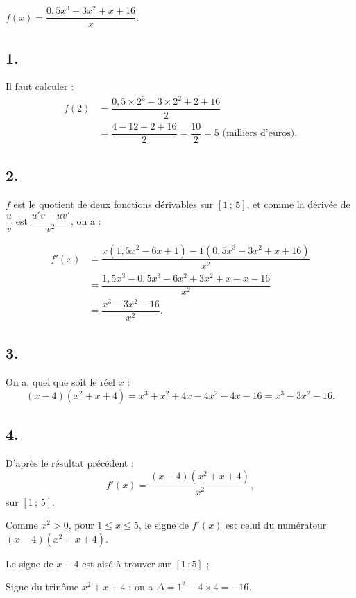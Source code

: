 \( f(x) = \dfrac{0{,}5x^3 - 3x^2 + x + 16}{x} \).

\subsection*{1.}

Il faut calculer :
\begin{align*}
f(2) &= \dfrac{0{,}5 \times 2^3 - 3 \times 2^2 + 2 + 16}{2} \\
&= \dfrac{4 - 12 + 2 + 16}{2} = \dfrac{10}{2} = 5 \text{ (milliers d'euros)}.
\end{align*}

\subsection*{2.}

\( f \) est le quotient de deux fonctions dérivables sur \([1 \,;\, 5]\), et comme la dérivée de \( \dfrac{u}{v} \) est \( \dfrac{u' v - u v'}{v^2} \), on a :

\begin{align*}
f'(x) &= \dfrac{x \left( 1{,}5x^2 - 6x + 1 \right) - 1 \left( 0{,}5x^3 - 3x^2 + x + 16 \right)}{x^2} \\
&= \dfrac{1{,}5x^3 - 0{,}5x^3 - 6x^2 + 3x^2 + x - x - 16}{x^2} \\
&= \dfrac{x^3 - 3x^2 - 16}{x^2}.
\end{align*}

\subsection*{3.}

On a, quel que soit le réel \(x\) :
\[
(x - 4)(x^2 + x + 4) = x^3 + x^2 + 4x - 4x^2 - 4x - 16 = x^3 - 3x^2 - 16.
\]

\subsection*{4.}

D'après le résultat précédent :
\[
f'(x) = \dfrac{(x - 4)(x^2 + x + 4)}{x^2},
\]
sur \([1 \,;\, 5]\).

Comme \( x^2 > 0 \), pour \( 1 \leqslant x \leqslant 5 \), le signe de \( f'(x) \) est celui du numérateur \( (x - 4)(x^2 + x + 4) \).

Le signe de \( x - 4 \) est aisé à trouver sur \( [1 \, ; 5] \) ;

Signe du trinôme \( x^2 + x + 4 \) : on a \( \Delta = 1^2 - 4 \times 4 = -16 \).

